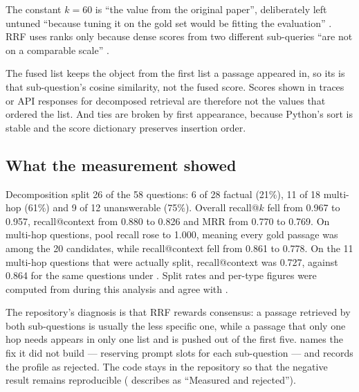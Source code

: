 The constant $k=60$ is \enquote{the value from the original paper}, deliberately left untuned \enquote{because tuning it on the gold set would be fitting the evaluation} . RRF uses ranks only because dense scores from two different sub-queries \enquote{are not on a comparable scale} .

\begin{inferred}
The fused list keeps the  object from the first list a passage appeared in, so its  is that sub-question's cosine similarity, not the fused score. Scores shown in traces or API responses for decomposed retrieval are therefore not the values that ordered the list. And ties are broken by first appearance, because Python's sort is stable and the score dictionary preserves insertion order.
\end{inferred}

\subsection{What the measurement showed}
\label{sec:decompose-result}

\begin{verified}
Decomposition split 26 of the 58 questions: 6 of 28 factual (21\%), 11 of 18 multi-hop (61\%) and 9 of 12 unanswerable (75\%). Overall recall@$k$ fell from 0.967 to 0.957, recall@context from 0.880 to 0.826 and MRR from 0.770 to 0.769. On multi-hop questions, pool recall rose to 1.000, meaning every gold passage was among the 20 candidates, while recall@context fell from 0.861 to 0.778. On the 11 multi-hop questions that were actually split, recall@context was 0.727, against 0.864 for the same questions under . Split rates and per-type figures were computed from  during this analysis and agree with .
\end{verified}

The repository's diagnosis is that RRF rewards consensus: a passage retrieved by both sub-questions is usually the less specific one, while a passage that only one hop needs appears in only one list and is pushed out of the first five.  names the fix it did not build --- reserving prompt slots for each sub-question --- and records the profile as rejected. The code stays in the repository so that the negative result remains reproducible ( describes  as \enquote{Measured and rejected}).

